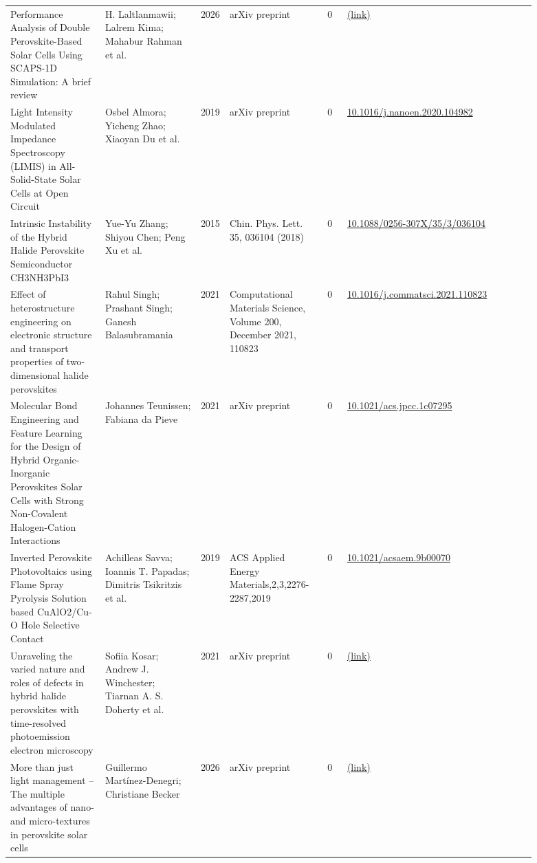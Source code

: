 \documentclass[10pt,a4paper]{article}
\begin{document}
{\begin{longtable}{p{0.197\linewidth}p{0.197\linewidth}p{0.043\linewidth}p{0.197\linewidth}p{0.043\linewidth}p{0.117\linewidth}p{0.098\linewidth}}
Performance Analysis of Double Perovskite-Based Solar Cells Using SCAPS-1D Simulation: A brief review & H. Laltlanmawii; Lalrem Kima; Mahabur Rahman et al. & 2026 & arXiv preprint & 0 & \href{http://arxiv.org/abs/2608.04736v1}{(link)} &  \\
Light Intensity Modulated Impedance Spectroscopy (LIMIS) in All-Solid-State Solar Cells at Open Circuit & Osbel Almora; Yicheng Zhao; Xiaoyan Du et al. & 2019 & arXiv preprint & 0 & \href{https://doi.org/10.1016/j.nanoen.2020.104982}{10.1016/j.nanoen.2020.104982} &  \\
Intrinsic Instability of the Hybrid Halide Perovskite Semiconductor CH3NH3PbI3 & Yue-Yu Zhang; Shiyou Chen; Peng Xu et al. & 2015 & Chin. Phys. Lett. 35, 036104 (2018) & 0 & \href{https://doi.org/10.1088/0256-307X/35/3/036104}{10.1088/0256-307X/35/3/036104} &  \\
Effect of heterostructure engineering on electronic structure and transport properties of two-dimensional halide perovskites & Rahul Singh; Prashant Singh; Ganesh Balasubramania & 2021 & Computational Materials Science, Volume 200, December 2021, 110823 & 0 & \href{https://doi.org/10.1016/j.commatsci.2021.110823}{10.1016/j.commatsci.2021.110823} &  \\
Molecular Bond Engineering and Feature Learning for the Design of Hybrid Organic-Inorganic Perovskites Solar Cells with Strong Non-Covalent Halogen-Cation Interactions & Johannes Teunissen; Fabiana da Pieve & 2021 & arXiv preprint & 0 & \href{https://doi.org/10.1021/acs.jpcc.1c07295}{10.1021/acs.jpcc.1c07295} &  \\
Inverted Perovskite Photovoltaics using Flame Spray Pyrolysis Solution based CuAlO2/Cu-O Hole Selective Contact & Achilleas Savva; Ioannis T. Papadas; Dimitris Tsikritzis et al. & 2019 & ACS Applied Energy Materials,2,3,2276-2287,2019 & 0 & \href{https://doi.org/10.1021/acsaem.9b00070}{10.1021/acsaem.9b00070} &  \\
Unraveling the varied nature and roles of defects in hybrid halide perovskites with time-resolved photoemission electron microscopy & Sofiia Kosar; Andrew J. Winchester; Tiarnan A. S. Doherty et al. & 2021 & arXiv preprint & 0 & \href{http://arxiv.org/abs/2107.12572v1}{(link)} &  \\
More than just light management -- The multiple advantages of nano- and micro-textures in perovskite solar cells & Guillermo Martínez-Denegri; Christiane Becker & 2026 & arXiv preprint & 0 & \href{http://arxiv.org/abs/2605.30182v2}{(link)} &  \\

\end{longtable}}
\end{document}
